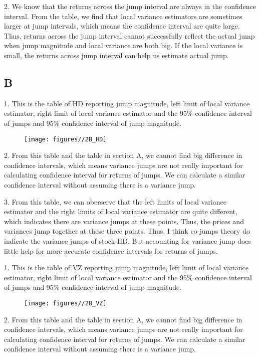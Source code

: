 \documentclass{report}
\begin{document}
2. We know that the returns across the jump interval are always in the confidence interval. From the table, we find that local variance estimators are sometimes larger at jump intervals, which means the confidence interval are quite large. Thus, returns across the jump interval cannot successfully reflect the actual jump when jump magnitude and local variance are both big. If the local variance is small, the returns across jump interval can help us estimate actual jump.

\subsection{B}
1. This is the table of HD reporting jump magnitude, left limit of local variance estimator, right limit of local variance estimator and the 95\% confidence interval of jumps and 95\% confidence interval of jump magnitude.
\begin{figure}[H]
        \centering 
         \texttt{[image: figures//2B\_HD]}
\end{figure}

2. From this table and the table in section A, we cannot find big difference in confidence intervals, which means variance jumps are not really important for calculating confidence interval for returns of jumps. We can calculate a similar confidence interval without assuming there is a variance jump.

3. From this table, we can oberserve that the left limits of local variance estimator and the right limits of local variance estimator are quite different, which indicates there are variance jumps at these points. Thus, the prices and variances jump together at these three points. Thus, I think co-jumps theory do indicate the variance jumps of stock HD. But accounting for variance jump does little help for more accurate confidence intervals for returns of jumps. 

1. This is the table of VZ reporting jump magnitude, left limit of local variance estimator, right limit of local variance estimator and the 95\% confidence interval of jumps and 95\% confidence interval of jump magnitude.
\begin{figure}[H]
        \centering 
         \texttt{[image: figures//2B\_VZ]}
\end{figure}

2. From this table and the table in section A, we cannot find big difference in confidence intervals, which means variance jumps are not really important for calculating confidence interval for returns of jumps. We can calculate a similar confidence interval without assuming there is a variance jump.
\end{document}
